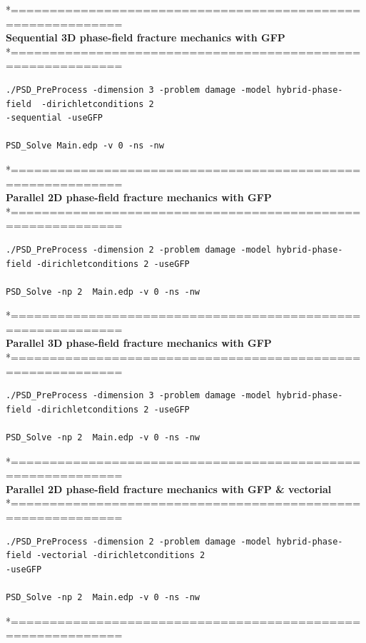 \documentclass{report}
\begin{document}
*============================================================\\
\textbf{ Sequential 3D phase-field fracture mechanics with GFP} \\
*============================================================\\
\begin{lstlisting}[style=Linux]
./PSD_PreProcess -dimension 3 -problem damage -model hybrid-phase-field  -dirichletconditions 2 
-sequential -useGFP   

PSD_Solve Main.edp -v 0 -ns -nw   
\end{lstlisting}
*============================================================\\
\textbf{ Parallel 2D phase-field fracture mechanics with GFP} \\
*============================================================\\
\begin{lstlisting}[style=Linux]
./PSD_PreProcess -dimension 2 -problem damage -model hybrid-phase-field -dirichletconditions 2 -useGFP   

PSD_Solve -np 2  Main.edp -v 0 -ns -nw   
\end{lstlisting}
*============================================================\\
\textbf{ Parallel 3D phase-field fracture mechanics with GFP }\\
*============================================================\\
\begin{lstlisting}[style=Linux]
./PSD_PreProcess -dimension 3 -problem damage -model hybrid-phase-field -dirichletconditions 2 -useGFP   

PSD_Solve -np 2  Main.edp -v 0 -ns -nw   
\end{lstlisting}
*============================================================\\
\textbf{ Parallel 2D phase-field fracture mechanics with GFP \& vectorial} \\
*============================================================\\
\begin{lstlisting}[style=Linux]
./PSD_PreProcess -dimension 2 -problem damage -model hybrid-phase-field -vectorial -dirichletconditions 2 
-useGFP   

PSD_Solve -np 2  Main.edp -v 0 -ns -nw   
\end{lstlisting}
*============================================================\\
\end{document}

